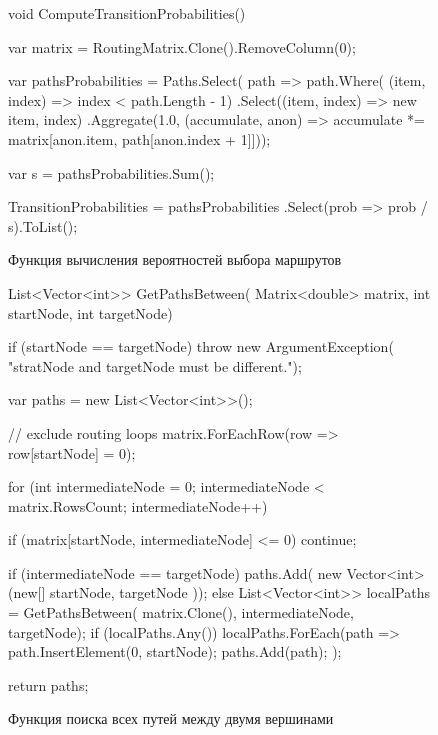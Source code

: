 \documentclass[oneside, draft, 14pt, a4paper]{extreport}
\begin{document}
\begin{figure}[h!]
	\begin{listing}{1}
void ComputeTransitionProbabilities()
  {
	var matrix = RoutingMatrix.Clone().RemoveColumn(0);

	var pathsProbabilities = 
	Paths.Select(
	path => path.Where(
	(item, index) => index < path.Length - 1)
	.Select((item, index) => new {item, index})
	.Aggregate(1.0, (accumulate, anon) => accumulate *=
	matrix[anon.item, path[anon.index + 1]]));

	var s = pathsProbabilities.Sum();

	TransitionProbabilities = pathsProbabilities
	.Select(prob => prob / s).ToList();
}\end{listing}

	\caption{Функция вычисления вероятностей выбора маршрутов}
	\label{pic:function_computeTransitionProbabilities}
\end{figure}

\begin{figure}[h!]
	\begin{listing}{1}
List<Vector<int>> GetPathsBetween(
  Matrix<double> matrix, int startNode, int targetNode)
{
  if (startNode == targetNode)
  throw new ArgumentException(
  "stratNode and targetNode must be different.");

  var paths = new List<Vector<int>>();

  // exclude routing loops
  matrix.ForEachRow(row => row[startNode] = 0);

  for (int intermediateNode = 0;
  intermediateNode < matrix.RowsCount; intermediateNode++)
  {
	if (matrix[startNode, intermediateNode] <= 0)
	  continue;

	if (intermediateNode == targetNode)
	  paths.Add(
	  new Vector<int>(new[] { startNode, targetNode }));
	else
	{
	  List<Vector<int>> localPaths = GetPathsBetween(
	  matrix.Clone(), intermediateNode, targetNode);
	  if (localPaths.Any())
		localPaths.ForEach(path =>
	  	{
		  path.InsertElement(0, startNode);
		  paths.Add(path);
	  	});
	  }
    }

  return paths;
}\end{listing}

	\caption{Функция поиска всех путей между двумя вершинами}
	\label{pic:function_getPathsBetween}
\end{figure}
\end{document}
